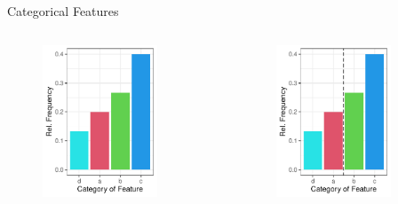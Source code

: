 \documentclass[11pt,compress,t,notes=noshow, xcolor=table]{beamer}
\begin{document}
\begin{frame}[noframenumbering]{Categorical Features}
\begin{columns}
\begin{column}{0.33\textwidth}
\begin{figure}
  \includegraphics[width=0.8\textwidth]{figure/categoryplot-binary2.pdf}
  \end{figure}
  \end{column}
  \begin{column}{0.33\textwidth}
  \begin{figure}
  \includegraphics[width=0.8\textwidth]{figure/categoryplot-binary3.pdf}
  \end{figure}
  \end{column}
  \end{columns}

\end{frame}
\end{document}
